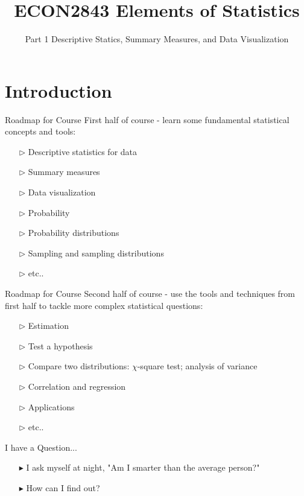 \documentclass[12pt]{beamer}
\title[ECON2843]{ECON2843 Elements of Statistics}
\subtitle{Part 1 Descriptive Statics, Summary Measures, and Data Visualization}
\date{}
\begin{document}
\begin{frame}
	\titlepage
\end{frame}
\section{Introduction}
\begin{frame}{Roadmap for Course}
	First half of course - learn some fundamental statistical concepts and tools:
		\begin{itemize}
			\item[$\triangleright$] Descriptive statistics for data
			\item[$\triangleright$] Summary measures
			\item[$\triangleright$] Data visualization
			\item[$\triangleright$] Probability
			\item[$\triangleright$] Probability distributions
			\item[$\triangleright$] Sampling and sampling distributions
			\item[$\triangleright$] etc..
		\end{itemize}
\end{frame}
\begin{frame}{Roadmap for Course}
	Second half of course - use the tools and techniques from first half to tackle more complex statistical questions:
	\begin{itemize}
		\item[$\triangleright$] Estimation
		\item[$\triangleright$] Test a hypothesis
		\item[$\triangleright$] Compare two distributions: $\chi$-square test; analysis of variance
		\item[$\triangleright$] Correlation and regression
		\item[$\triangleright$] Applications
		\item[$\triangleright$] etc..
	\end{itemize}
\end{frame}
\begin{frame}{I have a Question...}
	\begin{itemize}
		\item[$\blacktriangleright$] I ask myself at night, "Am I smarter than the average person?"
		\item[$\blacktriangleright$] How can I find out?
	\end{itemize}
\end{frame}
\end{document}

